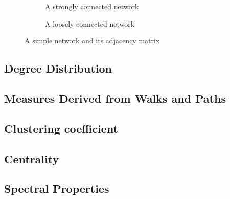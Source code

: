 \begin{figure}
    \begin{center}
        \begin{subfigure}[b]{0.45\textwidth}
            \caption{A strongly connected network}
            \label{fig:strongly_connected_network}
        \end{subfigure}
        \begin{subfigure}[b]{0.45\textwidth}
            \caption{A loosely connected network}
            \label{fig:loosely_connected_network}
        \end{subfigure}
    \end{center}
    \caption{A simple network and its adjacency matrix}
    \label{fig:connectivity_strengths}
\end{figure}


\subsection{Degree Distribution}

\subsection{Measures Derived from Walks and Paths}

\subsection{Clustering coefficient}

\subsection{Centrality}

\subsection{Spectral Properties}
